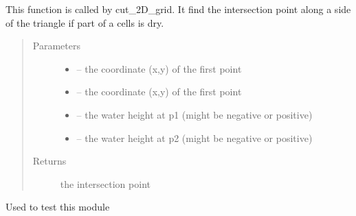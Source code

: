 \documentclass[letterpaper,10pt,english]{sphinxmanual}
\begin{document}
\begin{fulllineitems}
\label{\detokenize{index:src.manage_grid_8.linear_h_cross}}
This function is called by cut\_2D\_grid. It find the intersection point along a side of the triangle if part of a
cells is dry.
\begin{quote}\begin{description}
\item[{Parameters}] \leavevmode\begin{itemize}
\item {} 
 -- the coordinate (x,y) of the first point

\item {} 
 -- the coordinate (x,y) of the first point

\item {} 
 -- the water height at p1 (might be negative or positive)

\item {} 
 -- the water height at p2 (might be negative or positive)

\end{itemize}

\item[{Returns}] \leavevmode
the intersection point

\end{description}\end{quote}

\end{fulllineitems}


\begin{fulllineitems}
\label{\detokenize{index:src.manage_grid_8.main}}
Used to test this module

\end{fulllineitems}

\end{document}
